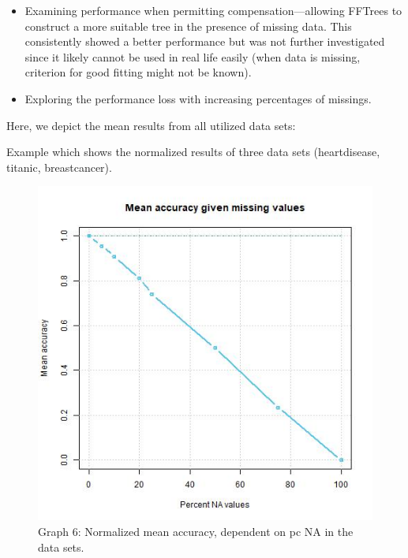 \documentclass[
]{article}
\begin{document}
\begin{itemize}
\item
  Examining performance when permitting compensation---allowing FFTrees
  to construct a more suitable tree in the presence of missing data.
  This consistently showed a better performance but was not further
  investigated since it likely cannot be used in real life easily (when
  data is missing, criterion for good fitting might not be known).
\item
  Exploring the performance loss with increasing percentages of
  missings.
\end{itemize}

Here, we depict the mean results from all utilized data sets:

Example which shows the normalized results of three data sets
(heartdisease, titanic, breastcancer).

\begin{figure}
\centering
\includegraphics{graphs/meanacc.jpg}
\caption{Graph 6: Normalized mean accuracy, dependent on pc NA in the
data sets.}
\end{figure}
\end{document}
